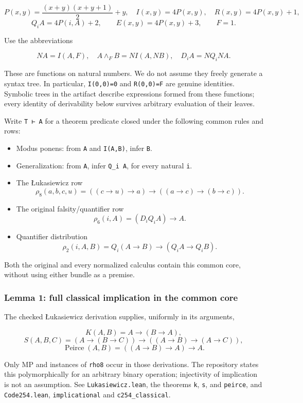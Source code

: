 \[
P(x,y)=\frac{(x+y)(x+y+1)}2+y,
\quad I(x,y)=4P(x,y),\quad R(x,y)=4P(x,y)+1,
\] \[
Q_i A=4P(i,A)+2,\qquad E(x,y)=4P(x,y)+3,\qquad F=1.
\]

Use the abbreviations

\[
NA=I(A,F),\quad A\mathbin{\wedge_F}B=N I(A,NB),
\quad D_iA=NQ_iNA.
\]

These are functions on natural numbers. We do not assume they freely
generate a syntax tree. In particular, \texttt{I(0,0)=0} and
\texttt{R(0,0)=F} are genuine identities. Symbolic trees in the artifact
describe expressions formed from these functions; every identity of
derivability below survives arbitrary evaluation of their leaves.

Write \texttt{T\ ⊢\ A} for a theorem predicate closed under the
following common rules and rows:

\begin{itemize}
\tightlist
\item
  Modus ponens: from \texttt{A} and \texttt{I(A,B)}, infer \texttt{B}.
\item
  Generalization: from \texttt{A}, infer \texttt{Q\_i\ A}, for every
  natural \texttt{i}.
\item
  The Łukasiewicz row \[
  \rho_8(a,b,c,u)=((c\to u)\to a)\to((a\to c)\to(b\to c)).
  \]
\item
  The original falsity/quantifier row \[
  \rho_6(i,A)=(D_iQ_iA)\to A.
  \]
\item
  Quantifier distribution \[
  \rho_2(i,A,B)=Q_i(A\to B)\to(Q_iA\to Q_iB).
  \]
\end{itemize}

Both the original and every normalized calculus contain this common
core, without using either bundle as a premise.

\hypertarget{lemma-1-full-classical-implication-in-the-common-core}{%
\subsubsection{Lemma 1: full classical implication in the common
core}\label{lemma-1-full-classical-implication-in-the-common-core}}

The checked Łukasiewicz derivation supplies, uniformly in its arguments,

\[
K(A,B)=A\to(B\to A),
\] \[
S(A,B,C)=(A\to(B\to C))\to((A\to B)\to(A\to C)),
\] \[
\operatorname{Peirce}(A,B)=((A\to B)\to A)\to A.
\]

Only MP and instances of \texttt{rho8} occur in those derivations. The
repository states this polymorphically for an arbitrary binary
operation; injectivity of implication is not an assumption. See
\texttt{Lukasiewicz.lean}, the theorems \texttt{k}, \texttt{s}, and
\texttt{peirce}, and \texttt{Code254.lean}, \texttt{implicational} and
\texttt{c254\_classical}.

